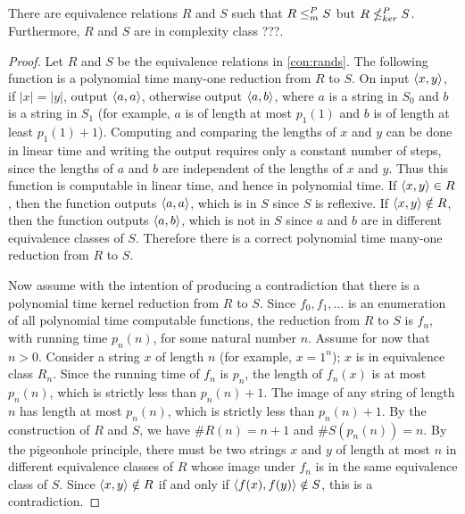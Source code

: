 \begin{theorem}
  There are equivalence relations $R$ and $S$ such that $R \leq^{P}_{m} S$ but $R \nleq^{P}_{ker} S$.
  Furthermore, $R$ and $S$ are in complexity class ???.
\end{theorem}
\begin{proof}
  Let $R$ and $S$ be the equivalence relations in \autoref{con:rands}.
  The following function is a polynomial time many-one reduction from $R$ to $S$.
  On input $\left\langle x,y\right\rangle$, if $|x| = |y|$, output $\left\langle a,a\right\rangle$, otherwise output $\left\langle a,b\right\rangle$, where $a$ is a string in $S_0$ and $b$ is a string in $S_1$ (for example, $a$ is of length at most $p_1(1)$ and $b$ is of length at least $p_1(1) + 1$).
  Computing and comparing the lengths of $x$ and $y$ can be done in linear time and writing the output requires only a constant number of steps, since the lengths of $a$ and $b$ are independent of the lengths of $x$ and $y$.
  Thus this function is computable in linear time, and hence in polynomial time.
  If $\left\langle x,y\right\rangle \in R$, then the function outputs $\left\langle a,a\right\rangle$, which is in $S$ since $S$ is reflexive.
  If $\left\langle x,y\right\rangle \notin R$, then the function outputs $\left\langle a,b\right\rangle$, which is not in $S$ since $a$ and $b$ are in different equivalence classes of $S$.
  Therefore there is a correct polynomial time many-one reduction from $R$ to $S$.

  Now assume with the intention of producing a contradiction that there is a polynomial time kernel reduction from $R$ to $S$.
  Since $f_0, f_1, \dotsc$ is an enumeration of all polynomial time computable functions, the reduction from $R$ to $S$ is $f_n$, with running time $p_n(n)$, for some natural number $n$.
  Assume for now that $n > 0$.
  Consider a string $x$ of length $n$ (for example, $x = 1^n$); $x$ is in equivalence class $R_n$.
  Since the running time of $f_n$ is $p_n$, the length of $f_n(x)$ is at most $p_n(n)$, which is strictly less than $p_n(n) + 1$.
  The image of any string of length $n$ has length at most $p_n(n)$, which is strictly less than $p_n(n) + 1$.
  By the construction of $R$ and $S$, we have $\#R(n) = n + 1$ and $\#S(p_n(n)) = n$.
  By the pigeonhole principle, there must be two strings $x$ and $y$ of length at most $n$ in different equivalence classes of $R$ whose image under $f_n$ is in the same equivalence class of $S$.
  Since $\left\langle x,y\right\rangle \notin R$ if and only if $\left\langle f(x),f(y)\right\rangle \notin S$, this is a contradiction.


\end{proof}
